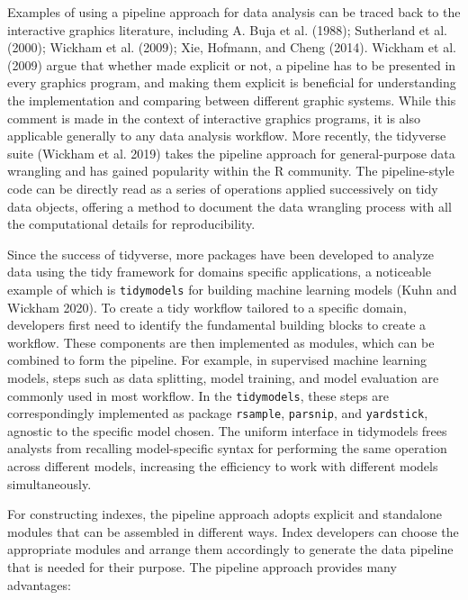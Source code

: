 \documentclass[
]{interact}
\begin{document}
Examples of using a pipeline approach for data analysis can be traced
back to the interactive graphics literature, including A. Buja et al.
(1988); Sutherland et al. (2000); Wickham et al. (2009); Xie, Hofmann,
and Cheng (2014). Wickham et al. (2009) argue that whether made explicit
or not, a pipeline has to be presented in every graphics program, and
making them explicit is beneficial for understanding the implementation
and comparing between different graphic systems. While this comment is
made in the context of interactive graphics programs, it is also
applicable generally to any data analysis workflow. More recently, the
tidyverse suite (Wickham et al. 2019) takes the pipeline approach for
general-purpose data wrangling and has gained popularity within the R
community. The pipeline-style code can be directly read as a series of
operations applied successively on tidy data objects, offering a method
to document the data wrangling process with all the computational
details for reproducibility.

Since the success of tidyverse, more packages have been developed to
analyze data using the tidy framework for domains specific applications,
a noticeable example of which is \texttt{tidymodels} for building
machine learning models (Kuhn and Wickham 2020). To create a tidy
workflow tailored to a specific domain, developers first need to
identify the fundamental building blocks to create a workflow. These
components are then implemented as modules, which can be combined to
form the pipeline. For example, in supervised machine learning models,
steps such as data splitting, model training, and model evaluation are
commonly used in most workflow. In the \texttt{tidymodels}, these steps
are correspondingly implemented as package \texttt{rsample},
\texttt{parsnip}, and \texttt{yardstick}, agnostic to the specific model
chosen. The uniform interface in tidymodels frees analysts from
recalling model-specific syntax for performing the same operation across
different models, increasing the efficiency to work with different
models simultaneously.

For constructing indexes, the pipeline approach adopts explicit and
standalone modules that can be assembled in different ways. Index
developers can choose the appropriate modules and arrange them
accordingly to generate the data pipeline that is needed for their
purpose. The pipeline approach provides many advantages:
\end{document}
